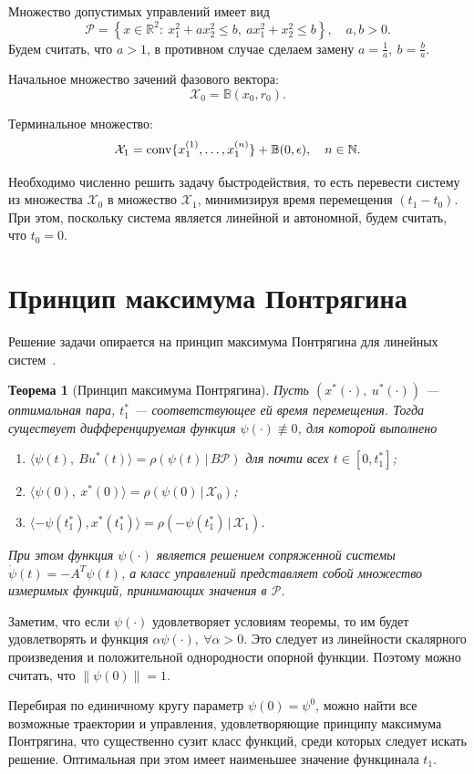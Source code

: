 \documentclass[11pt]{article}
\newtheorem{Th}{Теорема}
\newcommand\Real{\mathbb{R}}
\newcommand\PS{\mathcal{P}}
\newcommand\X{\mathcal{X}}
\newcommand\Sup[2]{\rho( #1 \, | \, #2 )}
\newcommand\Conv[1]{{\rm conv}\{ #1 \}}
\begin{document}
Множество допустимых управлений имеет вид 
$$ \PS = \left\{ x \in \Real^2 \colon \ x_1^2 + a x_2^2 \leq b, \ ax_1^2 + x_2^2 \leq b \right\}, \quad a,b > 0.$$
Будем считать, что $a > 1$, в противном случае сделаем замену $a = \frac{1}{a}, \ b = \frac{b}{a}$.

Начальное множество зачений фазового вектора: $$\X_0 = \mathbb{B}(x_0, r_0).$$

Терминальное множество: $$\X_1 = \Conv{x_1^{\left(1\right)}, \ldots, x_1^{\left(n\right)}} + \mathbb{B}(0, \epsilon), \quad n \in \mathbb{N}.$$

Необходимо численно решить задачу быстродействия, то есть перевести систему из множества $\X_0$ в множество $\X_1$,
минимизируя время перемещения $(t_1 - t_0)$. При этом, поскольку система является линейной и автономной, будем считать, что $t_0 = 0$.


\newpage
\section{Принцип максимума Понтрягина}
Решение задачи опирается на принцип максимума Понтрягина для линейных систем~\cite{rublev}.
\begin{Th}[Принцип максимума Понтрягина] 
Пусть $(x^*(\cdot), \ u^*(\cdot))$ --- оптимальная пара, $t_1^*$ --- соответствующее ей время перемещения. Тогда существует дифференцируемая функция 
$\psi(\cdot) \not\equiv 0$, для которой выполнено
\begin{enumerate}
\item $\langle \psi(t), \ Bu^*(t) \rangle = \Sup{\psi(t)}{B \PS}$ для почти всех $t \in [0, t_1^*]$; 
\item $\langle \psi(0), \ x^*(0) \rangle = \Sup{\psi(0)}{\X_0}$;
\item $\langle -\psi(t_1^*), x^*(t_1^*) \rangle = \Sup{-\psi(t_1^*)}{\X_1}$.
\end{enumerate}
При этом функция $\psi(\cdot)$ является решением сопряженной системы $\dot \psi(t) = -A^T\psi(t)$, а
класс управлений представляет собой множество измеримых функций, принимающих значения в $\PS$.
\end{Th}
 
Заметим, что если $\psi(\cdot)$ удовлетворяет условиям теоремы, то им будет удовлетворять и функция 
$\alpha \psi(\cdot), \ \forall \alpha > 0$. Это следует из линейности скалярного произведения и 
положительной однородности опорной функции. Поэтому можно считать, что $\|\psi(0)\| = 1$.

Перебирая по единичному кругу параметр $\psi(0) = \psi^0$, можно найти все возможные траектории 
и управления, удовлетворяющие принципу максимума Понтрягина, что существенно
сузит класс функций, среди которых следует искать решение. Оптимальная при этом 
имеет наименьшее значение функцинала $t_1$.
\end{document}

